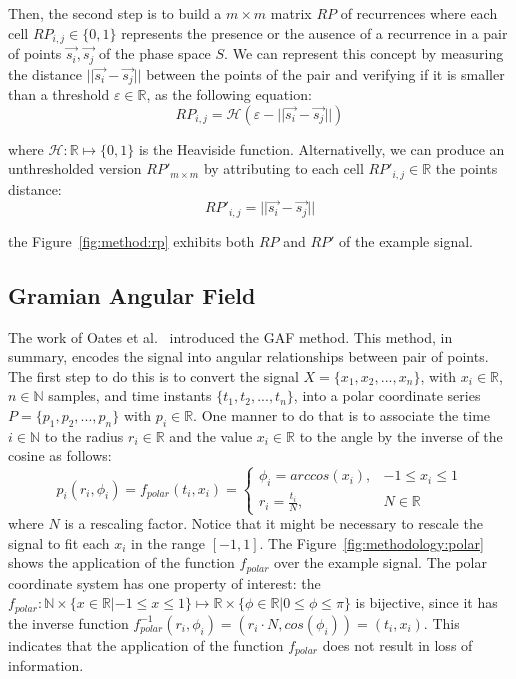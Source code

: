 

Then, the second step is to build a $m \times m$ matrix $RP$ of recurrences where each cell $RP_{i,j} \in \{0,1\}$ represents the presence or the ausence of a recurrence in a pair of points $\vec{s_i},\vec{s_j}$ of the phase space $S$. We can represent this concept by measuring the distance $||\vec{s_i} - \vec{s_j}||$ between the points of the pair and verifying if it is smaller than a threshold $\varepsilon \in \mathbb{R}$, as the following equation:
\begin{equation}
    RP_{i,j} = \mathcal{H}(\varepsilon - ||\vec{s_i} - \vec{s_j}||)
\end{equation}

\noindent where $\mathcal{H}: \mathbb{R} \mapsto \{0,1\}$ is the Heaviside function. Alternativelly, we can produce an unthresholded version $RP'_{m \times m}$ by attributing to each cell $RP'_{i,j} \in \mathbb{R}$ the points distance:
\begin{equation}
    RP'_{i,j} = ||\vec{s_i} - \vec{s_j}||
\end{equation}  

\noindent the Figure~\ref{fig:method:rp} exhibits both $RP$ and $RP'$ of the example signal.




\subsection{Gramian Angular Field}

The work of Oates et al.~\cite{gaf-mtf-1} introduced the \gls{GAF} method. This method, in summary, encodes the signal into angular relationships between pair of points. The first step to do this is to convert the signal $X=\{x_1,x_2,...,x_n\}$, with $x_i \in \mathbb{R}$, $n \in \mathbb{N}$ samples, and time instants $\{t_1,t_2,...,t_n\}$, into a polar coordinate series $P=\{p_1,p_2,...,p_n\}$ with $p_i \in \mathbb{R}$. One manner to do that is to associate the time $i \in \mathbb{N}$ to the radius $r_i \in \mathbb{R}$ and the value $x_i \in \mathbb{R}$ to the angle by the inverse of the cosine as follows:
\begin{equation}
    p_i(r_i, \phi_i) = f_{polar}(t_i, x_i) = 
    \begin{cases} 
        \phi_i = arccos(x_i), & -1 \leq x_i \leq 1\\
        r_i = \frac{t_i}{N},     & N \in \mathbb{R}
    \end{cases}
\end{equation}
\noindent where $N$ is a rescaling factor. Notice that it might be necessary to rescale the signal to fit each $x_i$ in the range $[-1,1]$. The Figure~\ref{fig:methodology:polar} shows the application of the function $f_{polar}$ over the example signal. The polar coordinate system has one property of interest: the $f_{polar}: \mathbb{N} \times \{x \in \mathbb{R}| -1 \leq x \leq 1\} \mapsto \mathbb{R} \times \{\phi \in \mathbb{R}| 0 \leq \phi \leq \pi \}$ is bijective, since it has the inverse function $f_{polar}^{-1}(r_i, \phi_i)=(r_i \cdot N, cos(\phi_i))=(t_i,x_i)$. This indicates that the application of the function $f_{polar}$ does not result in loss of information.

